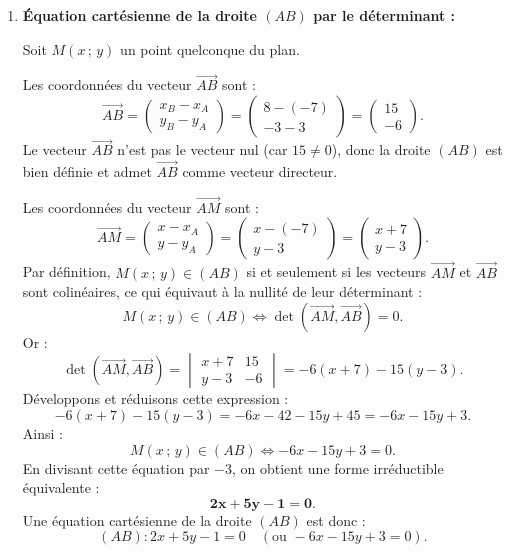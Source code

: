 \documentclass[11pt,a4paper]{article}
\newcommand{\vect}[1]{\overrightarrow{#1}}
\begin{document}
\begin{correctionbox}
\begin{enumerate}
    \item \textbf{Équation cartésienne de la droite $(AB)$ par le déterminant :}
    
    Soit $M(x\,;\,y)$ un point quelconque du plan.
    
    Les coordonnées du vecteur $\vect{AB}$ sont :
    \[
    \vect{AB} = \begin{pmatrix} x_B - x_A \\ y_B - y_A \end{pmatrix} = \begin{pmatrix} 8 - (-7) \\ -3 - 3 \end{pmatrix} = \begin{pmatrix} 15 \\ -6 \end{pmatrix}.
    \]
    Le vecteur $\vect{AB}$ n'est pas le vecteur nul (car $15 \neq 0$), donc la droite $(AB)$ est bien définie et admet $\vect{AB}$ comme vecteur directeur.
    
    Les coordonnées du vecteur $\vect{AM}$ sont :
    \[
    \vect{AM} = \begin{pmatrix} x - x_A \\ y - y_A \end{pmatrix} = \begin{pmatrix} x - (-7) \\ y - 3 \end{pmatrix} = \begin{pmatrix} x + 7 \\ y - 3 \end{pmatrix}.
    \]
    Par définition, $M(x\,;\,y) \in (AB)$ si et seulement si les vecteurs $\vect{AM}$ et $\vect{AB}$ sont colinéaires, ce qui équivaut à la nullité de leur déterminant :
    \[
    M(x\,;\,y) \in (AB) \iff \det(\vect{AM}, \vect{AB}) = 0.
    \]
    Or :
    \[
    \det(\vect{AM}, \vect{AB}) = \begin{vmatrix} x + 7 & 15 \\ y - 3 & -6 \end{vmatrix} = -6(x + 7) - 15(y - 3).
    \]
    Développons et réduisons cette expression :
    \[
    -6(x + 7) - 15(y - 3) = -6x - 42 - 15y + 45 = -6x - 15y + 3.
    \]
    Ainsi :
    \[
    M(x\,;\,y) \in (AB) \iff -6x - 15y + 3 = 0.
    \]
    En divisant cette équation par $-3$, on obtient une forme irréductible équivalente :
    \[
    \mathbf{2x + 5y - 1 = 0}.
    \]
    Une équation cartésienne de la droite $(AB)$ est donc :
    \[
    (AB) : 2x + 5y - 1 = 0 \quad (\text{ou } -6x - 15y + 3 = 0).
    \]


\end{enumerate}
\end{correctionbox}
\end{document}

